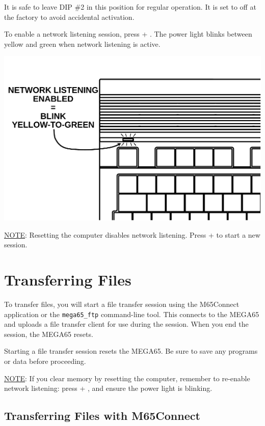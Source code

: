 It is safe to leave DIP \#2 in this position for regular operation. It is set to off at the factory to avoid accidental activation.

To enable a network listening session, press  + \megakey{\pounds}. The power light blinks between yellow and green when network listening is active.

\begin{center}
\includegraphics[width=\linewidth]{images/illustrations/mega65-eth-blink.pdf}
\end{center}

\underline{NOTE}: Resetting the computer disables network listening. Press  + \megakey{\pounds} to start a new session.

\section{Transferring Files}

To transfer files, you will start a file transfer session using the M65Connect application or the {\tt mega65\_ftp} command-line tool. This connects to the MEGA65 and uploads a file transfer client for use during the session. When you end the session, the MEGA65 resets.

Starting a file transfer session resets the MEGA65. Be sure to save any programs or data before proceeding.

\underline{NOTE}: If you clear memory by resetting the computer, remember to re-enable network listening: press  + \megakey{\pounds}, and ensure the power light is blinking.

\subsection{Transferring Files with M65Connect}

